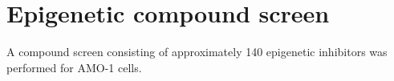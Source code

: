 \chapter{Epigenetic compound screen}

A compound screen consisting of approximately 140 epigenetic inhibitors was performed for AMO-1 cells. 

